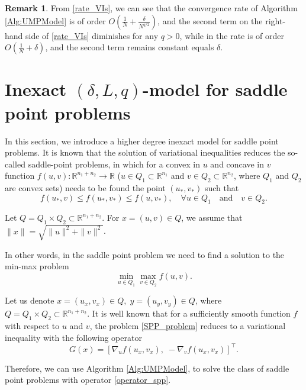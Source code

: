 \documentclass[11pt]{amsart}
\theoremstyle{definition}
\newtheorem{remark}[theorem]{Remark}
\numberwithin{equation}{section}
\begin{document}
\begin{remark}
From \eqref{rate_VIs}, we can see that the convergence rate of Algorithm \ref{Alg:UMPModel} is of order $O\left( \frac{1}{N} + \frac{\delta}{N^{q/2}} \right)$, and the second term on the right-hand side of \eqref{rate_VIs} diminishes for any $q>0$, while in \cite{Stonyakin2021OMS} the rate is of order $O\left( \frac{1}{N} + \delta \right)$, and the second term remains constant equals $\delta$.   
\end{remark}


\section{Inexact $(\delta, L, q)$-model for saddle point problems}\label{Sect:SPP}

In this section, we introduce a higher degree inexact model for saddle point problems. It is known that the solution of variational inequalities reduces the so-called saddle-point problems, in which for a convex in $u$ and concave in $v$ function $f(u,v):\mathbb{R}^{n_1+n_2}\longrightarrow\mathbb{R}$ ($u\in Q_1\subset\mathbb{R}^{n_1}$ and $v\in Q_2\subset\mathbb{R}^{n_2}$, where $Q_1$ and $Q_2$ are convex sets) needs to be found the point $(u_*, v_*)$ such that
\begin{equation}\label{eq31}
f(u_*,v)\leq f(u_*,v_*)\leq f(u,v_*), \quad \forall u\in Q_1 \quad \text{and} \quad  v\in Q_2. 
\end{equation}

Let $Q=Q_1\times Q_2\subset\mathbb{R}^{n_1+n_2}$. For $x=(u,v)\in Q$, we assume that $\|x\|=\sqrt{\|u\|^2+\|v\|^2}$.

In other words, in the saddle point problem we need to find a solution to the min-max problem 
\begin{equation}\label{SPP_problem}
    \min_{u \in Q_1} \max_{v \in Q_2 } f(u, v). 
\end{equation}

Let us denote $x=(u_x,v_x) \in Q,\;y=(u_y,v_y)\in Q$, where $Q=Q_1\times Q_2\subset\mathbb{R}^{n_1+n_2}$. It is well known that for a sufficiently smooth function $f$ with respect to $u$ and $v$, the problem \eqref{SPP_problem} reduces to a variational inequality with the following operator 
\begin{equation}\label{operator_spp}
    G(x)= \left[ \nabla_u f(u_x,v_x), \; - \nabla_v f(u_x,v_x)\right]^\top.
\end{equation}

Therefore, we can use Algorithm \ref{Alg:UMPModel}, to solve the class of saddle point problems with operator \eqref{operator_spp}.
\end{document}
